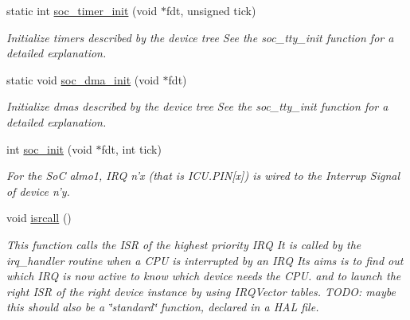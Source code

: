 \begin{DoxyCompactItemize}
static int \hyperlink{almo1-mips_2soc_8c_aeb589179b71725cd918f71b4f23b21d2}{soc\-\_\-timer\-\_\-init} (void $\ast$fdt, unsigned tick)
\begin{DoxyCompactList}\small\item\em Initialize timers described by the device tree See the soc\-\_\-tty\-\_\-init function for a detailed explanation. \end{DoxyCompactList}\item 
static void \hyperlink{almo1-mips_2soc_8c_a5fb66f75ca9173a1a6dd99fc4be6706b}{soc\-\_\-dma\-\_\-init} (void $\ast$fdt)
\begin{DoxyCompactList}\small\item\em Initialize dmas described by the device tree See the soc\-\_\-tty\-\_\-init function for a detailed explanation. \end{DoxyCompactList}\item 
int \hyperlink{almo1-mips_2soc_8c_a436517497969d33b08925565d4cca572}{soc\-\_\-init} (void $\ast$fdt, int tick)
\begin{DoxyCompactList}\small\item\em For the So\-C almo1, I\-R\-Q n'x (that is I\-C\-U.\-P\-I\-N\mbox{[}x\mbox{]}) is wired to the Interrup Signal of device n'y. \end{DoxyCompactList}\item 
void \hyperlink{almo1-mips_2soc_8c_af2c90b7651cda327df23f561f6c6ebfd}{isrcall} ()
\begin{DoxyCompactList}\small\item\em This function calls the I\-S\-R of the highest priority I\-R\-Q It is called by the irq\-\_\-handler routine when a C\-P\-U is interrupted by an I\-R\-Q Its aims is to find out which I\-R\-Q is now active to know which device needs the C\-P\-U. and to launch the right I\-S\-R of the right device instance by using I\-R\-Q\-Vector tables. T\-O\-D\-O\-: maybe this should also be a \char`\"{}standard\char`\"{} function, declared in a H\-A\-L file. \end{DoxyCompactList}\end{DoxyCompactItemize}


